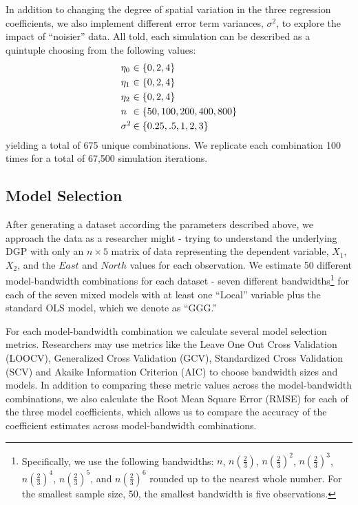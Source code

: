 \documentclass{article}\usepackage[]{graphicx}\usepackage[]{color}
\begin{document}
In addition to changing the degree of spatial variation in the three regression coefficients, we also implement different error term variances, $\sigma ^2$, to explore the impact of ``noisier'' data. All told, each simulation can be described as a quintuple choosing from the following values:
\begin{align}
\makebox[.35 cm][l]{$\eta _0$} & \in \{0, 2, 4\}   \\ \nonumber
\makebox[.35 cm][l]{$\eta _1$} & \in \{0, 2, 4\}  \\ \nonumber
\makebox[.35 cm][l]{$\eta _2$} & \in \{0, 2, 4\} \\ \nonumber
\makebox[.35 cm][l]{$n$} & \in \{50, 100, 200, 400, 800\}  \\ \nonumber
\makebox[.35 cm][l]{$\sigma ^2$} & \in \{0.25, .5, 1, 2, 3\} 
\end{align}
yielding a total of 675 unique combinations. We replicate each combination 100 times for a total of 67,500 simulation iterations.

\subsection{Model Selection}

After generating a dataset according the parameters described above, we approach the data as a researcher might - trying to understand the underlying DGP with only an $n \times 5$ matrix of data representing the dependent variable, $X_1$, $X_2$, and the $East$ and $North$ values for each observation. We estimate 50 different model-bandwidth combinations for each dataset - seven different bandwidths\footnote{Specifically, we use the following bandwidths: $n$, $n\left(\frac{2}{3}\right)$, $n\left(\frac{2}{3}\right)^2$, $n\left(\frac{2}{3}\right)^3$, $n\left(\frac{2}{3}\right)^4$, $n\left(\frac{2}{3}\right)^5$, and $n\left(\frac{2}{3}\right)^6$ rounded up to the nearest whole number. For the smallest sample size, 50, the smallest bandwidth is five observations.} for each of the seven mixed models with at least one ``Local'' variable plus the standard OLS model, which we denote as ``GGG.'' 

For each model-bandwidth combination we calculate several model selection metrics. Researchers may use metrics like the Leave One Out Cross Validation (LOOCV), Generalized Cross Validation (GCV), Standardized Cross Validation (SCV) and Akaike Information Criterion (AIC) to choose bandwidth sizes and models. In addition to comparing these metric values across the model-bandwidth combinations, we also calculate the Root Mean Square Error (RMSE) for each of the three model coefficients, which allows us to compare the accuracy of the coefficient estimates across model-bandwidth combinations.
\end{document}
